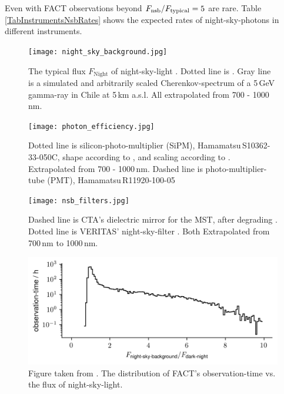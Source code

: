 \documentclass{article}%
\begin{document}
\begin{multicols}{2}
%
Even with FACT observations beyond $F_\text{nsb}{} / F_\text{typical}{} = 5$ are rare.
%
Table \ref{TabInstrumentsNsbRates} shows the expected rates of night-sky-photons in different instruments.
%
\begin{figure}[H]%
\centering%
\texttt{[image: night\_sky\_background.jpg]}%
\caption{
The typical flux $F_\text{Night}$ of night-sky-light \cite{gaug2013night}.
Dotted line is \cite{preuss2002study}.
Gray line is a simulated and arbitrarily scaled Cherenkov-spectrum of a 5\,GeV gamma-ray in Chile at 5\,km a.s.l.
All extrapolated from 700 - 1000\,nm.
}%
\label{fig:nsb}
\end{figure}
%
\begin{figure}[H]%
\centering%
\texttt{[image: photon\_efficiency.jpg]}%
\caption{
Dotted line is silicon-photo-multiplier (SiPM), \mbox{Hamamatsu\,S10362-33-050C}, shape according to \cite{hamamatsu2009mppc}, and scaling according to \cite{anderhub2013design}.
Extrapolated from 700 - 1000\,nm.
Dashed line is photo-multiplier-tube (PMT), \mbox{Hamamatsu\,R11920-100-05} \cite{toyama2013novel}
}%
\label{fig:pde}
\end{figure}
%
\begin{figure}[H]%
\centering%
\texttt{[image: nsb\_filters.jpg]}%
\caption{
Dashed line is CTA's dielectric mirror for the MST, after degrading \cite{pareschi2013status,pareschi2013statusarxiv}.
%
Dotted line is VERITAS' night-sky-filter \cite{archambault2017gamma}.
%
Both Extrapolated from 700\,nm to 1000\,nm.
}%
\label{FigNsbFilter}
\end{figure}
%
\begin{figure}[H]%
\centering%
\includegraphics[width=1.0\linewidth]{observation_time_histogram.png}%
\caption{
Figure taken from \cite{mueller2019phd}.
%
The distribution of FACT's observation-time vs. the flux of night-sky-light.
}%
\label{fig:obstimeFact}
\end{figure}
%
\begin{table}[H]
  \begin{center}

\end{center}
\end{table}
\end{multicols}
\end{document}
